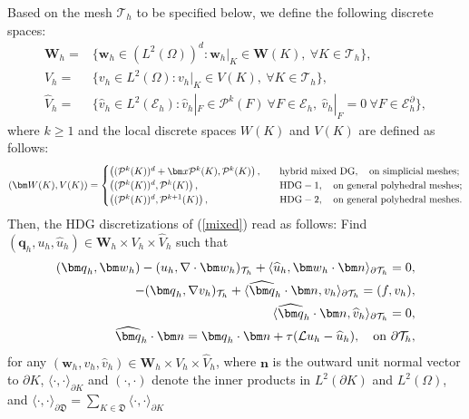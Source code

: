\documentclass[1996/10/24]{amsart}
\theoremstyle{definition}
\numberwithin{equation}{section}
\begin{document}
Based on the mesh $\mathcal{T}_h$ to be specified below, we define
the following discrete spaces:
\begin{align*}
{\bm W}_h=&\{{\bm w}_h\in (L^2(\Omega))^d: {\bm w}_h|_K\in {\bm W}(K),~\forall K\in\mathcal{T}_h\},\\
V_h=&\{v_h\in L^2(\Omega): v_h|_K\in V(K),~\forall K\in\mathcal{T}_h\},\\
\widehat{V}_h=&\{\widehat{v}_h\in L^2(\mathcal{E}_h): \widehat{v}_h|_F\in\mathcal{P}^k(F)~\forall F\in\mathcal{E}_h,~\widehat{v}_h|_F=0~\forall F\in\mathcal{E}_h^{\partial}\},
\end{align*}
where $k\geq 1$ and the local discrete spaces $W(K)$ and $V(K)$ are defined as follows:
\begin{align*}
({\bm W}(K), V(K)) = \begin{cases}
\left((\mathcal{P}^k(K))^d+{\bm x}\mathcal{P}^k(K), \mathcal{P}^k(K)\right),\quad &{\rm hybrid~mixed~DG},
\quad \text{on simplicial meshes};\\
\left((\mathcal{P}^k(K))^d,\mathcal{P}^k(K)\right),\quad &{\rm HDG}-1,\quad \text{on general polyhedral meshes};\\
\left((\mathcal{P}^k(K))^d,\mathcal{P}^{k+1}(K)\right),\quad &{\rm HDG}-2,\quad \text{on general polyhedral meshes}.
\end{cases}
\end{align*}
Then, the HDG discretizations of (\ref{mixed}) read as follows: Find $({\bm q}_h,u_h,\widehat{u}_h)\in
{\bm W}_h\times V_h\times \widehat{V}_h$ such that
\begin{subequations}\label{HDG}
\begin{align}
({\bm q}_h,{\bm w}_h)-(u_h,\nabla\cdot{\bm w}_h)_{\mathcal{T}_h}+\langle\widehat{u}_h,{\bm w}_h\cdot{\bm n}\rangle_{\partial\mathcal{T}_h}=0,\label{HDG:1}\\
-({\bm q}_h,\nabla v_h)_{\mathcal{T}_h}+\langle\widehat{\bm q}_h\cdot{\bm n},v_h\rangle_{\partial\mathcal{T}_h}=(f,v_h),\label{HDG:2}\\
\langle\widehat{\bm q}_h\cdot{\bm n},\widehat{v}_h\rangle_{\partial\mathcal{T}_h}=0,\label{HDG:3}\\
\widehat{\bm q}_h\cdot{\bm n}={\bm q}_h\cdot{\bm n}+\tau(\mathcal{L}u_h-\widehat{u}_h),\quad {\rm on}~\partial\mathcal{T}_h,\label{HDG:4}
\end{align}
\end{subequations}
for any $({\bm w}_h,v_h,\widehat{v}_h)\in {\bm W}_h\times V_h\times \widehat{V}_h$, where ${\bm n}$ is the outward unit normal vector to $\partial K$, $\langle\cdot,\cdot\rangle_{\partial K}$ and $(\cdot,\cdot)$ denote the inner products in $L^2(\partial K)$ and $L^2(\Omega)$, and $\langle\cdot,\cdot\rangle_{\partial \mathfrak{D}}=\sum_{K\in \mathfrak{D}} \langle\cdot,\cdot\rangle_{\partial K}$
\end{document}
